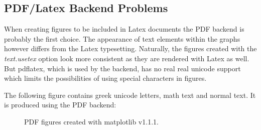 \documentclass[12pt, a4paper]{article}
\begin{document}
\subsection*{PDF/Latex Backend Problems}

When creating figures to be included in Latex documents the PDF backend is probably the first choice. The appearance of text elements within the graphs however differs from the Latex typesetting. Naturally, the figures created with the \textit{text.usetex} option look more consistent as they are rendered with Latex as well. But pdflatex, which is used by the backend, has no real real unicode support which limits the possibilities of using special characters in figures.

The following figure contains greek unicode letters, math text and normal text. It is produced using the PDF backend:

\begin{figure}[h]
\hspace{1mm}
\caption{PDF figures created with matplotlib v1.1.1.}
\end{figure}
\end{document}
